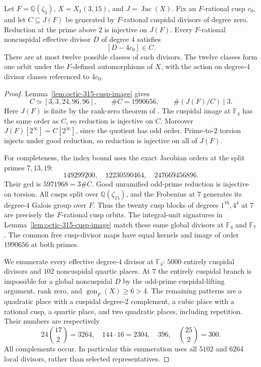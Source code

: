 \begin{lemma}\label{lem:octic-315-exact-specialization}
Let $F=\mathbb Q(\zeta_3)$, $X=X_1(3,15)$, and
$J=\operatorname{Jac}(X)$. Fix an $F$-rational cusp $c_0$, and
let $C\subseteq J(F)$ be generated by $F$-rational cuspidal
divisors of degree zero. Reduction at the prime above $2$ is
injective on $J(F)$. Every $F$-rational noncuspidal effective
divisor $D$ of degree $4$ satisfies
\[
 [D-4c_0]\in C.
\]
There are at most twelve possible classes of such divisors.
The twelve classes form one orbit under the $F$-defined
automorphisms of $X$, with the action on degree-$4$ divisor
classes referenced to $4c_0$.
\end{lemma}
\begin{proof}
Lemma~\ref{lem:octic-315-cusp-image} gives
\[
 C\simeq[3,3,24,96,96],\qquad\#C=1990656,
 \qquad\#(J(F)/C)\mid3.
\]
Here $J(F)$ is finite by the rank-zero theorem of
\cite[Theorem~4.1]{DS}. The cuspidal image at $\mathbb F_4$
has the same order as $C$, so reduction is injective on $C$.
Moreover $J(F)[2^\infty]=C[2^\infty]$, since the quotient has
odd order. Prime-to-$2$ torsion injects under good reduction,
so reduction is injective on all of $J(F)$.

For completeness, the index bound uses the exact Jacobian
orders at the split primes $7,13,19$:
\[
149299200,\quad12230590464,\quad247669456896.
\]
Their gcd is $5971968=3\#C$. Good unramified odd-prime
reduction is injective on torsion. All cusps split over
$\mathbb Q(\zeta_{15})$, and the Frobenius at $7$ generates
its degree-$4$ Galois group over $F$. Thus the twenty cusp
blocks of degrees $1^{16},4^4$ at $7$ are precisely the
$F$-rational cusp orbits. The integral-unit signatures in
Lemma~\ref{lem:octic-315-cusp-image} match these same global
divisors at $\mathbb F_4$ and $\mathbb F_7$. The common
free cusp-divisor maps have equal kernels and image of
order $1990656$ at both primes.

We enumerate every effective degree-$4$ divisor at
$\mathbb F_4$: $5000$ entirely cuspidal divisors and $102$
noncuspidal quartic places. At $7$ the entirely cuspidal
branch is impossible for a global noncuspidal $D$ by the
odd-prime cuspidal-lifting argument, rank zero, and
$\operatorname{gon}_F(X)\geq6>4$. The remaining patterns
are a quadratic place with a cuspidal degree-$2$ complement,
a cubic place with a rational cusp, a quartic place, and
two quadratic places, including repetition. Their numbers
are respectively
\[
24\binom{17}{2}=3264,\quad144\cdot16=2304,
\quad396,\quad\binom{25}{2}=300.
\]
All complements occur. In particular this enumeration uses
all $5102$ and $6264$ local divisors, rather than selected
representatives.


\end{proof}
